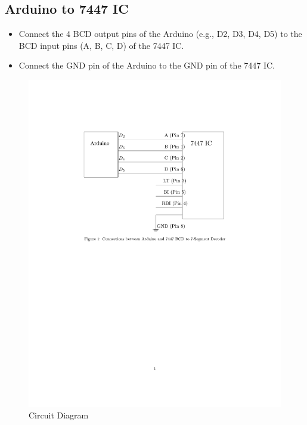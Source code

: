 \documentclass[journal]{IEEEtran}
\begin{document}
\subsection{Arduino to 7447 IC}
\begin{itemize}
    \item Connect the 4 BCD output pins of the Arduino (e.g., D2, D3, D4, D5) to the BCD input pins (A, B, C, D) of the 7447 IC.
    \item Connect the GND pin of the Arduino to the GND pin of the 7447 IC.
\end{itemize}
\begin{figure}[H]
    \centering
    \includegraphics[width=0.8\linewidth]{figure/fig1.png}
    \caption{Circuit Diagram}
    \label{fig:circuit}
\end{figure}
\end{document}
